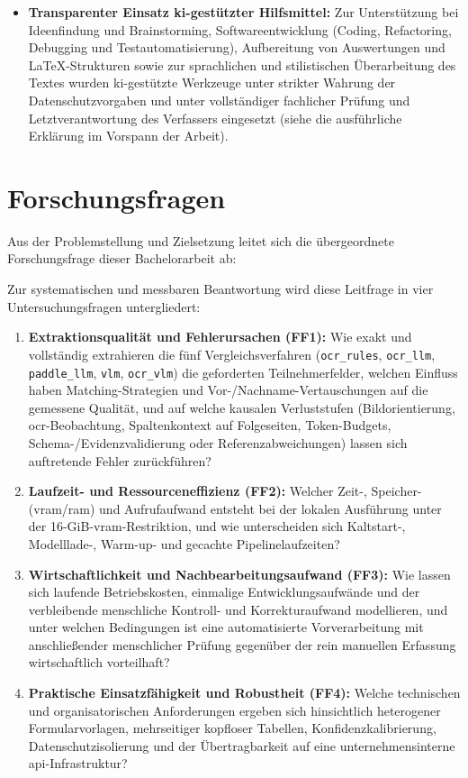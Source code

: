 \begin{itemize}
  \item \textbf{Transparenter Einsatz \ac{ki}-gestützter Hilfsmittel:} Zur Unterstützung bei Ideenfindung und Brainstorming, Softwareentwicklung (Coding, Refactoring, Debugging und Testautomatisierung), Aufbereitung von Auswertungen und \LaTeX-Strukturen sowie zur sprachlichen und stilistischen Überarbeitung des Textes wurden \ac{ki}-gestützte Werkzeuge unter strikter Wahrung der Datenschutzvorgaben und unter vollständiger fachlicher Prüfung und Letztverantwortung des Verfassers eingesetzt (siehe die ausführliche Erklärung im Vorspann der Arbeit).
\end{itemize}

\section{Forschungsfragen}
\label{sec:forschungsfrage}

Aus der Problemstellung und Zielsetzung leitet sich die übergeordnete Forschungsfrage dieser Bachelorarbeit ab:

\begin{quote}
  \emph{\researchquestion}
\end{quote}

Zur systematischen und messbaren Beantwortung wird diese Leitfrage in vier Untersuchungsfragen untergliedert:

\begin{enumerate}
  \item \textbf{Extraktionsqualität und Fehlerursachen (FF1):} Wie exakt und vollständig extrahieren die fünf Vergleichsverfahren (\texttt{ocr\_rules}, \texttt{ocr\_llm}, \texttt{paddle\_llm}, \texttt{vlm}, \texttt{ocr\_vlm}) die geforderten Teilnehmerfelder, welchen Einfluss haben Matching-Strategien und Vor-/Nachname-Vertauschungen auf die gemessene Qualität, und auf welche kausalen Verluststufen (Bildorientierung, \ac{ocr}-Beobachtung, Spaltenkontext auf Folgeseiten, Token-Budgets, Schema-/Evidenzvalidierung oder Referenzabweichungen) lassen sich auftretende Fehler zurückführen?
  \item \textbf{Laufzeit- und Ressourceneffizienz (FF2):} Welcher Zeit-, Speicher- (\ac{vram}/\ac{ram}) und Aufrufaufwand entsteht bei der lokalen Ausführung unter der \mbox{16-GiB}-\ac{vram}-Restriktion, und wie unterscheiden sich Kaltstart-, Modelllade-, Warm-up- und gecachte Pipelinelaufzeiten?
  \item \textbf{Wirtschaftlichkeit und Nachbearbeitungsaufwand (FF3):} Wie lassen sich laufende Betriebskosten, einmalige Entwicklungsaufwände und der verbleibende menschliche Kontroll- und Korrekturaufwand modellieren, und unter welchen Bedingungen ist eine automatisierte Vorverarbeitung mit anschließender menschlicher Prüfung gegenüber der rein manuellen Erfassung wirtschaftlich vorteilhaft?
  \item \textbf{Praktische Einsatzfähigkeit und Robustheit (FF4):} Welche technischen und organisatorischen Anforderungen ergeben sich hinsichtlich heterogener Formularvorlagen, mehrseitiger kopfloser Tabellen, Konfidenzkalibrierung, Datenschutzisolierung und der Übertragbarkeit auf eine unternehmensinterne \ac{api}-Infrastruktur?
\end{enumerate}

